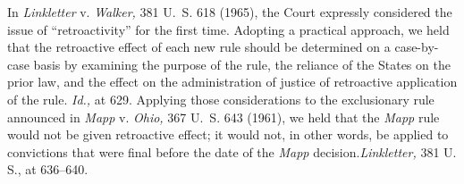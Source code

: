   In \emph{Linkletter} v. \emph{Walker,} 381 U.~S. 618 (1965), the Court
expressly considered the issue of ``retroactivity'' for the first
time. Adopting a practical approach, we held that the retroactive
effect of each new rule should be determined on a case-by-case basis
by examining the purpose of the rule, the reliance of the States on
the prior law, and the effect on the administration of justice of
retroactive application of the rule. \emph{Id.,} at 629. Applying
those considerations to the exclusionary rule announced in \emph{Mapp}
v. \emph{Ohio,} 367 U.~S. 643 (1961), we held that the \emph{Mapp} rule
would not be given retroactive effect; it would not, in other words, be
applied to convictions that were final before the date of the \emph{Mapp}
decision.\footnotemark[8] \emph{Linkletter,} 381 U. S., at 636--640.

